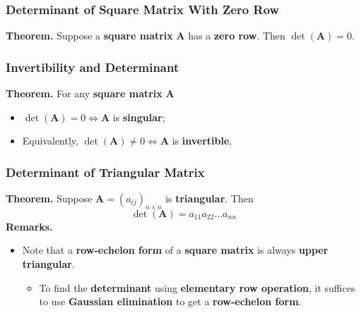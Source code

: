 \documentclass[../ma2001_notes.tex]{subfiles}
\begin{document}
\subsubsection{Determinant of Square Matrix With Zero Row}
\textbf{Theorem.} Suppose a \textbf{square matrix} \(\bm{A}\) has a \textbf{zero row}. Then \(\det(\bm{A})=0\).

\subsubsection{Invertibility and Determinant}
\textbf{Theorem.} For any \textbf{square matrix} \(\bm{A}\)
\begin{itemize}
	\item\(\det(\bm{A})=0\iff\bm{A}\) is \textbf{singular};
	\item Equivalently, \(\det(\bm{A})\ne0\iff\bm{A}\) is \textbf{invertible},
\end{itemize}

\subsubsection{Determinant of Triangular Matrix}
\textbf{Theorem.} Suppose \(\bm{A}=(a_{ij})_{n\times n}\) is \textbf{triangular}. Then
\[\det(\bm{A})=a_{11}a_{22}\ldots a_{nn}\]
\textbf{Remarks.}
\begin{itemize}
	\item Note that a \textbf{row-echelon form} of a \textbf{square matrix} is always \textbf{upper triangular}.
	\begin{itemize}
		\item To find the \textbf{determinant} using \textbf{elementary row operation}, it suffices to use \textbf{Gaussian elimination} to get a \textbf{row-echelon form}.
	\end{itemize}
\end{itemize}
\end{document}
